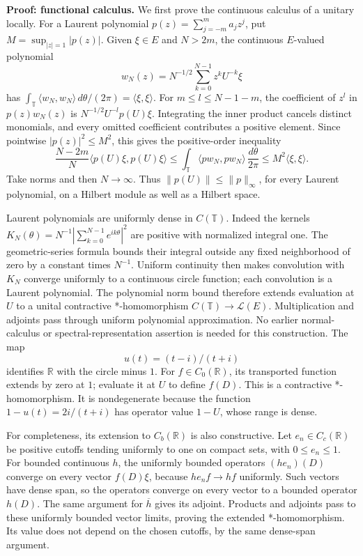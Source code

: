 \documentclass[
  11pt,
]{article}
\begin{document}
\textbf{Proof: functional calculus.} We first prove the continuous
calculus of a unitary locally. For a Laurent polynomial
\(p(z)=\sum_{j=-m}^m a_jz^j\), put \(M=\sup_{|z|=1}|p(z)|\). Given
\(\xi\in E\) and \(N>2m\), the continuous \(E\)-valued polynomial \[
w_N(z)=N^{-1/2}\sum_{k=0}^{N-1}z^kU^{-k}\xi
\] has
\(\int_{\mathbb T}\langle w_N,w_N\rangle\,d\theta/(2\pi)=\langle\xi,\xi\rangle\).
For \(m\leq l\leq N-1-m\), the coefficient of \(z^l\) in \(p(z)w_N(z)\)
is \(N^{-1/2}U^{-l}p(U)\xi\). Integrating the inner product cancels
distinct monomials, and every omitted coefficient contributes a positive
element. Since pointwise \(|p(z)|^2\leq M^2\), this gives the
positive-order inequality \[
\frac{N-2m}{N}\langle p(U)\xi,p(U)\xi\rangle
\leq \int_{\mathbb T}\langle p w_N,p w_N\rangle\,\frac{d\theta}{2\pi}
\leq M^2\langle\xi,\xi\rangle.
\] Take norms and then \(N\to\infty\). Thus
\(\|p(U)\|\leq\|p\|_\infty\), for every Laurent polynomial, on a Hilbert
module as well as a Hilbert space.

Laurent polynomials are uniformly dense in \(C(\mathbb T)\). Indeed the
kernels \(K_N(\theta)=N^{-1}|\sum_{k=0}^{N-1}e^{ik\theta}|^2\) are
positive with normalized integral one. The geometric-series formula
bounds their integral outside any fixed neighborhood of zero by a
constant times \(N^{-1}\). Uniform continuity then makes convolution
with \(K_N\) converge uniformly to a continuous circle function; each
convolution is a Laurent polynomial. The polynomial norm bound therefore
extends evaluation at \(U\) to a unital contractive *-homomorphism
\(C(\mathbb T)\to\mathcal L(E)\). Multiplication and adjoints pass
through uniform polynomial approximation. No earlier normal-calculus or
spectral-representation assertion is needed for this construction. The
map \[
u(t)=(t-i)/(t+i)
\] identifies \(\mathbb R\) with the circle minus \(1\). For
\(f\in C_0(\mathbb R)\), its transported function extends by zero at
\(1\); evaluate it at \(U\) to define \(f(D)\). This is a contractive
*-homomorphism. It is nondegenerate because the function
\(1-u(t)=2i/(t+i)\) has operator value \(1-U\), whose range is dense.

For completeness, its extension to \(C_b(\mathbb R)\) is also
constructive. Let \(e_n\in C_c(\mathbb R)\) be positive cutoffs tending
uniformly to one on compact sets, with \(0\leq e_n\leq1\). For bounded
continuous \(h\), the uniformly bounded operators \((he_n)(D)\) converge
on every vector \(f(D)\xi\), because \(he_nf\to hf\) uniformly. Such
vectors have dense span, so the operators converge on every vector to a
bounded operator \(h(D)\). The same argument for \(\overline h\) gives
its adjoint. Products and adjoints pass to these uniformly bounded
vector limits, proving the extended *-homomorphism. Its value does not
depend on the chosen cutoffs, by the same dense-span argument.
\end{document}
